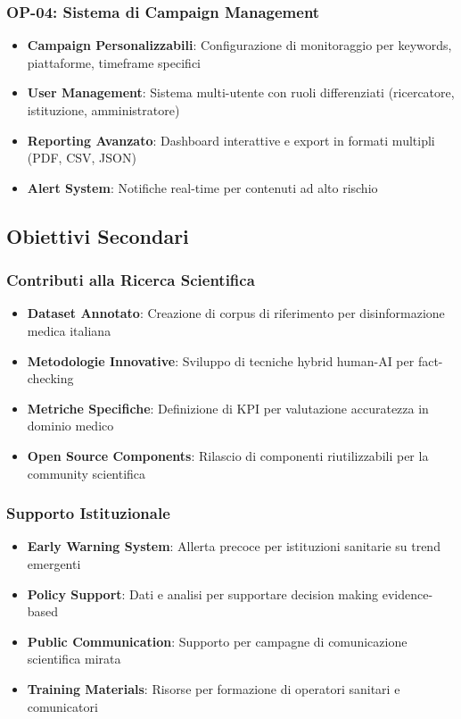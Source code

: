 \documentclass[12pt,a4paper]{report}
\begin{document}
\subsubsection{OP-04: Sistema di Campaign Management}

\begin{itemize}
    \item \textbf{Campaign Personalizzabili}: Configurazione di monitoraggio per keywords, piattaforme, timeframe specifici
    \item \textbf{User Management}: Sistema multi-utente con ruoli differenziati (ricercatore, istituzione, amministratore)
    \item \textbf{Reporting Avanzato}: Dashboard interattive e export in formati multipli (PDF, CSV, JSON)
    \item \textbf{Alert System}: Notifiche real-time per contenuti ad alto rischio
\end{itemize}

\subsection{Obiettivi Secondari}

\subsubsection{Contributi alla Ricerca Scientifica}

\begin{itemize}
    \item \textbf{Dataset Annotato}: Creazione di corpus di riferimento per disinformazione medica italiana
    \item \textbf{Metodologie Innovative}: Sviluppo di tecniche hybrid human-AI per fact-checking
    \item \textbf{Metriche Specifiche}: Definizione di KPI per valutazione accuratezza in dominio medico
    \item \textbf{Open Source Components}: Rilascio di componenti riutilizzabili per la community scientifica
\end{itemize}

\subsubsection{Supporto Istituzionale}

\begin{itemize}
    \item \textbf{Early Warning System}: Allerta precoce per istituzioni sanitarie su trend emergenti
    \item \textbf{Policy Support}: Dati e analisi per supportare decision making evidence-based
    \item \textbf{Public Communication}: Supporto per campagne di comunicazione scientifica mirata
    \item \textbf{Training Materials}: Risorse per formazione di operatori sanitari e comunicatori
\end{itemize}
\end{document}

